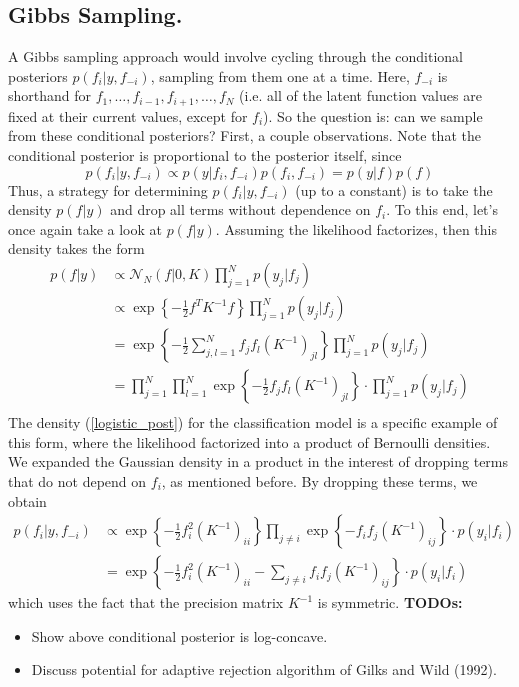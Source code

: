 \documentclass[12pt]{article}
\begin{document}
\subsection{Gibbs Sampling.} A Gibbs sampling approach would involve cycling through the conditional posteriors $p(f_i|y, f_{-i})$, sampling from them one at a time. 
Here, $f_{-i}$ is shorthand for $f_1, \dots, f_{i - 1}, f_{i + 1}, \dots, f_N$ (i.e. all of the latent function values are fixed at their current values, except for $f_i$). So the question is:
can we sample from these conditional posteriors? First, a couple observations. Note that the conditional posterior is proportional to the posterior itself, since
\[p(f_i|y, f_{-i}) \propto p(y|f_i, f_{-i})p(f_i, f_{-i}) = p(y|f)p(f)\]
Thus, a strategy for determining $p(f_i|y, f_{-i})$ (up to a constant) is to take the density $p(f|y)$ and drop all terms without dependence on $f_i$. To this end, let's once again 
take a look at $p(f|y)$. Assuming the likelihood factorizes, then this density takes the form 
\begin{align*}
p(f|y) &\propto \mathcal{N}_N(f|0, K) \prod_{j = 1}^{N} p(y_j|f_j) \\
	 &\propto \exp\left\{-\frac{1}{2} f^T K^{-1} f \right\} \prod_{j = 1}^{N} p(y_j|f_j) \\
	 &= \exp\left\{-\frac{1}{2} \sum_{j,l = 1}^{N} f_j f_l \left(K^{-1}\right)_{jl} \right\} \prod_{j = 1}^{N} p(y_j|f_j) \\
	 &= \prod_{j = 1}^{N} \prod_{l = 1}^{N} \exp\left\{-\frac{1}{2} f_j f_l \left(K^{-1}\right)_{jl} \right\} \cdot \prod_{j = 1}^{N} p(y_j|f_j) \\
\end{align*}
The density (\ref{logistic_post}) for the classification model is a specific example of this form, where the likelihood factorized into a product of Bernoulli densities. We expanded 
the Gaussian density in a product in the interest of dropping terms that do not depend on $f_i$, as mentioned before. By dropping these terms, we obtain 
\begin{align*}
p(f_i|y, f_{-i}) &\propto \exp\left\{-\frac{1}{2}f_i^2 \left(K^{-1}\right)_{ii} \right\} \prod_{j \neq i} \exp\left\{-f_i f_j \left(K^{-1}\right)_{ij} \right\} \cdot p(y_i|f_i) \\
		    &= \exp\left\{-\frac{1}{2} f_i^2 \left(K^{-1}\right)_{ii} - \sum_{j \neq i} f_i f_j \left(K^{-1}\right)_{ij} \right\} \cdot p(y_i|f_i)
\end{align*}
which uses the fact that the precision matrix $K^{-1}$ is symmetric. 
\textbf{TODOs:}
\begin{itemize}
\item Show above conditional posterior is log-concave. 
\item Discuss potential for adaptive rejection algorithm of Gilks and Wild (1992). 
\end{itemize} 
\end{document}
